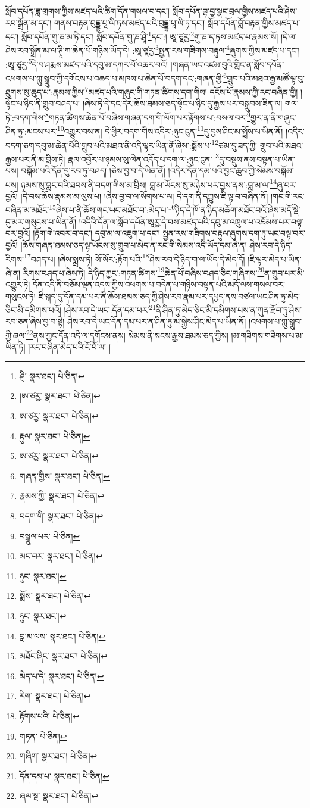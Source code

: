 སློབ་དཔོན་ཟླ་གྲགས་ཀྱིས་མཛད་པའི་ཚིག་དོན་གསལ་བ་དང་། སློབ་དཔོན་བྷ་བྱ་སྣང་བྲལ་གྱིས་མཛད་པའི་ཤེས་རབ་སྒྲོན་མ་དང་། གནས་བརྟན་བུདྡྷ་པཱ་ལི་ཏས་མཛད་པའི་བུདྡྷ་པཱ་ལི་ཏ་དང་། སློབ་དཔོན་བློ་བརྟན་གྱིས་མཛད་པ་དང་། སློབ་དཔོན་གུ་ཎ་མ་ཏི་དང་། སློབ་དཔོན་གུ་ཎ་ཤྲཱི་\footnote{ཤྲི་  སྣར་ཐང་།  པེ་ཅིན། }དང་:། ཨཱ་ཙཱརྱ་\footnote{།ཨ་ཙརྱ་  སྣར་ཐང་།  པེ་ཅིན། }གུ་ཎ་ད་ཏས་མཛད་པ་རྣམས་སོ། །དེ་ལ་ཤེས་རབ་སྒྲོན་མ་ལ་ཊཱི་ཀ་ཆེན་པོ་གཉིས་ཡོད་དེ། :ཨཱ་ཙཱརྱ་\footnote{ཨ་ཙརྱ་  སྣར་ཐང་།  པེ་ཅིན། }སྤྱན་རས་གཟིགས་བརྟུལ་\footnote{རྟུལ་  སྣར་ཐང་།  པེ་ཅིན། }ཞུགས་ཀྱིས་མཛད་པ་དང་། :ཨཱ་ཙཱརྱ་\footnote{ཨ་ཙརྱ་  སྣར་ཐང་།  པེ་ཅིན། }དེ་བ་ཤརྨས་མཛད་པའི་དབུ་མ་དཀར་པོ་འཆར་བའོ། །གཞན་ཡང་འཛམ་བུའི་གླིང་ན་སློབ་དཔོན་འཕགས་པ་ཀླུ་སྒྲུབ་ཀྱི་དགོངས་པ་འཆད་པ་མཁས་པ་ཆེན་པོ་བདག་དང་:གཞན་གྱི་\footnote{གཞན་གྱིས་  སྣར་ཐང་།  པེ་ཅིན། }གྲུབ་པའི་མཐའ་རྒྱ་མཚོ་ལྟ་བུ་ཐུགས་སུ་ཆུད་པ་:རྣམས་ཀྱིས་\footnote{རྣམས་ཀྱི་  སྣར་ཐང་།  པེ་ཅིན། }མཛད་པའི་གཞུང་གི་གཏན་ཚིགས་དག་གིས། དངོས་པོ་རྣམས་ཀྱི་རང་བཞིན་གྱི། །སྟོང་པ་ཉིད་ནི་གྲུབ་བཤད་པ། །ཞེས་ཏེ་དེ་དང་དེར་ཆོས་ཐམས་ཅད་སྟོང་པ་ཉིད་དུ་རྒྱས་པར་བསྒྲུབས་ཟིན་ལ། གལ་ཏེ་:བདག་གིས་\footnote{བདག་གི་  སྣར་ཐང་།  པེ་ཅིན། }གཏན་ཚིགས་ཆེན་པོ་བཞིས་གཞན་དག་གི་ལོག་པར་རྟོགས་པ་:བསལ་བར་\footnote{བསྒྲུལ་པར་  པེ་ཅིན། }གྱུར་ན་ནི་གཞུང་ཤིན་ཏུ་:མངས་པར་\footnote{མང་བར་  སྣར་ཐང་།  པེ་ཅིན། }འགྱུར་བས་ན། དེ་ཕྱིར་བདག་གིས་འདིར་:ཉུང་ངུན་\footnote{ཉུང་  སྣར་ཐང་། }དུ་བྱས་ཤིང་མ་སྤྲོས་པ་ཡིན་ནོ། །འདིར་བདག་ཅག་དབུ་མ་ཆེན་པོའི་གྲུབ་པའི་མཐའ་ནི་འདི་ལྟར་ཡིན་ནོ་ཞེས་:སྨོས་པ་\footnote{སྨོས་  སྣར་ཐང་།  པེ་ཅིན། }ཙམ་དུ་ཟད་ཀྱི། གྲུབ་པའི་མཐའ་རྒྱས་པར་ནི་མ་བྲིས་ཏེ། རྣལ་འབྱོར་པ་ཉམས་སུ་ལེན་འདོད་པ་དག་ལ་:ཉུང་ངུན་\footnote{ཉུང་  སྣར་ཐང་། }དུ་བསྡུས་ནས་བསྟན་པ་ཡིན་པས། བསྒོམ་པའི་དོན་དུ་རབ་ཏུ་བཤད། །ཅེས་བྱ་བ་དེ་ཡིན་ནོ། །འདིར་དོན་དམ་པའི་བྱང་ཆུབ་ཀྱི་སེམས་བསྒོམ་པས། ཉམས་སུ་བླང་བའི་ཐབས་ནི་བདག་གིས་མ་བྲིས། བླ་མ་ཡོངས་སུ་མཉེས་པར་བྱས་ནས་:བླ་མ་ལ་\footnote{བླ་མ་ལས་  སྣར་ཐང་།  པེ་ཅིན། }ཞུ་བར་བྱའོ། །དེ་བས་ཆོས་རྣམས་མ་ལུས་པ། །ཞེས་བྱ་བ་ལ་སོགས་པ་ལ། དེ་དག་ནི་དཀྱུས་ཇི་ལྟ་བ་བཞིན་ནོ། །གང་གི་རང་བཞིན་མ་མཐོང་\footnote{མཐོང་ཞིང་  སྣར་ཐང་།  པེ་ཅིན། }ཞེས་པ་ནི་ཆོས་གང་ཡང་མཐོང་བ་:མེད་པ་\footnote{མེད་པ་དེ་  སྣར་ཐང་།  པེ་ཅིན། }ཉིད་དེ་ཁོ་ན་ཉིད་མཆོག་མཐོང་བའོ་ཞེས་མདོ་སྡེ་དུ་མར་གསུངས་པ་ཡིན་ནོ། །འདིའི་དོན་ལ་སློབ་དཔོན་ཨཱརྱ་དེ་བས་མཛད་པའི་དབུ་མ་འཁྲུལ་པ་འཇོམས་པར་བལྟ་བར་བྱའོ། །རྟོག་གེ་འབར་བ་དང་། དབུ་མ་ལ་འཇུག་པ་དང་། སྤྱན་རས་གཟིགས་བརྟུལ་ཞུགས་དག་ཏུ་ཡང་བལྟ་བར་བྱའོ། །ཆོས་གཞན་ཐམས་ཅད་ལྟ་ཡོངས་སུ་གྲུབ་པ་མེད་ན་རང་གི་སེམས་འདི་ཡོད་དམ་ཞེ་ན། ཤེས་རབ་དེ་ཉིད་རིགས་\footnote{རིག་  སྣར་ཐང་།  པེ་ཅིན། }བཤད་པ། །ཞེས་སྨྲས་ཏེ། སོ་སོར་:རྟོག་པའི་\footnote{རྟོགས་པའི་  པེ་ཅིན། }ཤེས་རབ་དེ་ཉིད་ག་ལ་ཡོད་དེ་མེད་དོ། །ཇི་ལྟར་མེད་པ་ཡིན་ཞེ་ན། རིགས་བཤད་པ་ཞེས་ཏེ། དེ་ཉིད་ཀྱང་:གཏན་ཚིགས་\footnote{གཏན་  པེ་ཅིན། }ཆེན་པོ་བཞིས་བཤད་ཅིང་གཞིགས་\footnote{གཞིག་  སྣར་ཐང་།  པེ་ཅིན། }ན་གྲུབ་པར་མི་འགྱུར་ཏེ། དོན་འདི་ནི་བཅོམ་ལྡན་འདས་ཀྱིས་འཕགས་པ་བདེན་པ་གཉིས་བསྟན་པའི་མདོ་ལས་གསལ་བར་གསུངས་ཏེ། ཇི་སྐད་དུ་དོན་དམ་པར་ནི་ཆོས་ཐམས་ཅད་ཀྱི་ཤེས་རབ་རྣམ་པར་དཔྱད་ནས་བཙལ་ཡང་ཤིན་ཏུ་མེད་ཅིང་མི་དམིགས་པའོ། །ཤེས་རབ་དེ་ཡང་:དོན་དམ་པར་\footnote{དོན་དམ་པ་  སྣར་ཐང་།  པེ་ཅིན། }ནི་ཤིན་ཏུ་མེད་ཅིང་མི་དམིགས་པས་ན་ཀུན་རྫོབ་ཏུ་ཤེས་རབ་ཅན་ཞེས་བྱ་བ་སྟེ། ཤེས་རབ་དེ་ཡང་དོན་དམ་པར་ན་ཤིན་ཏུ་མ་སྐྱེས་ཤིང་མེད་པ་ཡིན་ནོ། །འཕགས་པ་ཀླུ་སྒྲུབ་ཀྱི་ཞལ་\footnote{ཞལ་སྔ་  སྣར་ཐང་།  པེ་ཅིན། }ནས་ཀྱང་དོན་འདི་ལ་དགོངས་ནས། སེམས་ནི་སངས་རྒྱས་ཐམས་ཅད་ཀྱིས། །མ་གཟིགས་གཟིགས་པ་མ་ཡིན་ཏེ། །རང་བཞིན་མེད་པའི་ངོ་བོ་ལ། །
